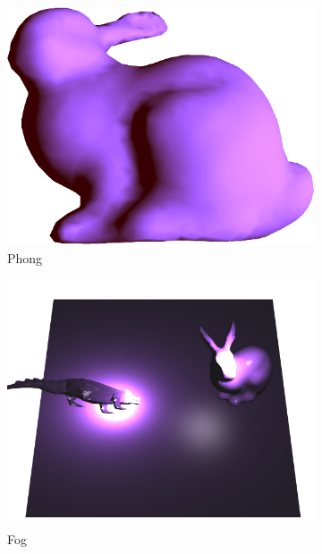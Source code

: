 \begin{figure}
	\begin{subfigure}[b]{0.45\linewidth}
		\centering
		\includegraphics[width=\linewidth]{fig/bunnygoodfront.png}
		\caption{Phong}
	\end{subfigure}
	\hfill
	\begin{subfigure}[b]{0.45\linewidth}
		\centering
		\includegraphics[width=\linewidth]{fig/fog.png}
		\caption{Fog}
	\end{subfigure}
	\begin{subfigure}[b]{0.45\linewidth}
		\centering

\end{subfigure}
\end{figure}
